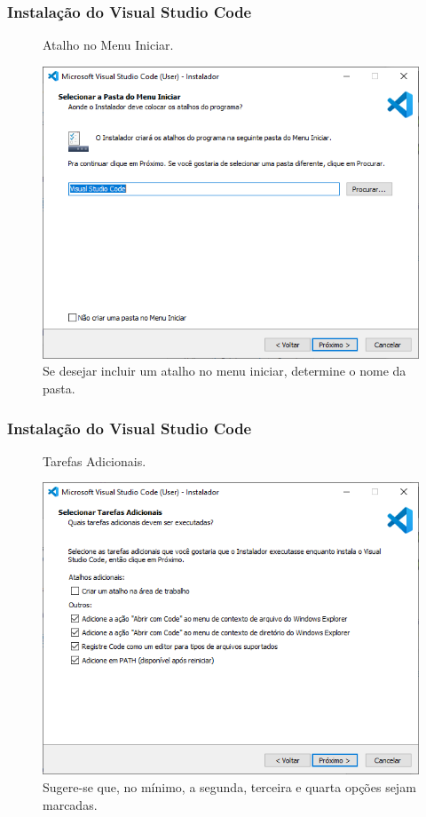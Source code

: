 \documentclass[brazilian]{beamer}
\begin{document}
\begin{frame}
    \frametitle{Instalação do Visual Studio Code}
    \begin{figure}[h]
        \centering
        \caption{Atalho no Menu Iniciar.}
        \label{fig:atalho_menu_iniciar}
        \includegraphics[width=0.8\textheight]{../images/atalho_menu_iniciar.png}
        \caption*{\footnotesize Se desejar incluir um atalho no menu iniciar, determine o nome da pasta.}
    \end{figure}
\end{frame}

\begin{frame}
    \frametitle{Instalação do Visual Studio Code}
    \begin{figure}[h]
        \centering
        \caption{Tarefas Adicionais.}
        \label{fig:tarefas_adicionais}
        \includegraphics[width=0.8\textheight]{../images/tarefas adicionais.png}
        \caption*{\footnotesize Sugere-se que, no mínimo, a segunda, terceira e quarta opções sejam marcadas.}
    \end{figure}
\end{frame}
\end{document}

